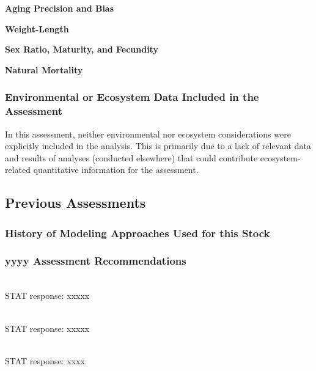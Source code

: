 \documentclass[12pt,]{article}
\begin{document}
\vspace{.5cm} \textbf{Aging Precision and Bias}

\vspace{.5cm} \textbf{Weight-Length}

\vspace{.5cm} \textbf{Sex Ratio, Maturity, and Fecundity}

\vspace{.5cm} \textbf{Natural Mortality}

\vspace{.5cm}

\subsubsection{Environmental or Ecosystem Data Included in the
Assessment}\label{environmental-or-ecosystem-data-included-in-the-assessment}

In this assessment, neither environmental nor ecosystem considerations
were explicitly included in the analysis. This is primarily due to a
lack of relevant data and results of analyses (conducted elsewhere) that
could contribute ecosystem-related quantitative information for the
assessment.

\subsection{Previous Assessments}\label{previous-assessments}

\subsubsection{History of Modeling Approaches Used for this
Stock}\label{history-of-modeling-approaches-used-for-this-stock}

\subsubsection{yyyy Assessment
Recommendations}\label{yyyy-assessment-recommendations}

\begin{description}[style=unboxed]

  \item[Recommendation 1: ] \hfill \\

   STAT response: xxxxx

\item[Recommendation 2: ] \hfill \\

  STAT response: xxxxx

\item[Recommendation 3: ] \hfill \\

  STAT response: xxxx

  
\end{description}
\end{document}
